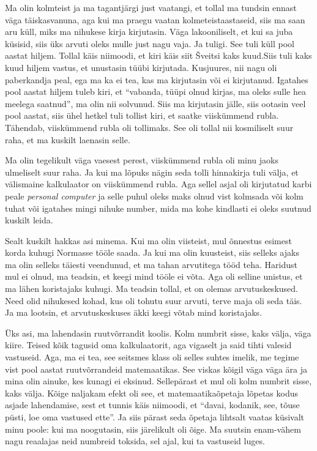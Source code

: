 Ma olin kolmteist ja ma  tagantjärgi just vaatangi, et tollal ma tundsin ennast väga täiskasvanuna, aga kui ma praegu vaatan kolmeteistaastaseid, siis ma saan aru küll, miks ma nihukese kirja kirjutasin. Väga lakooniliselt, et kui sa juba küsisid, siis üks arvuti oleks mulle just nagu vaja. Ja tuligi. See tuli küll pool aastat hiljem. Tollal käis niimoodi, et kiri käis siit Šveitsi kaks kuud.Siis tuli kaks kuud hiljem vastus, et unustasin tüübi kirjutada. Kusjuures, nii nagu oli paberkandja peal, ega ma ka ei tea, kas ma kirjutasin või ei kirjutanud. Igatahes pool aastat hiljem tuleb kiri, et \enquote{vabanda, tüüpi olnud kirjas, ma oleks sulle hea meelega saatnud}, ma olin nii solvunud. Siis ma kirjutasin jälle, siis ootasin veel pool aastat, siis ühel hetkel tuli tollist kiri, et  saatke viiskümmend rubla. Tähendab,  viiskümmend rubla oli tollimaks. See oli tollal nii kosmiliselt suur raha, et ma kuskilt laenasin selle. 


Ma olin tegelikult väga vaesest perest, viiskümmend rubla oli minu jaoks ulmeliselt suur raha. Ja kui ma lõpuks nägin seda tolli hinnakirja tuli välja, et välismaine kalkulaator on viiskümmend rubla. Aga sellel asjal oli kirjutatud karbi peale \emph{personal computer} ja selle puhul oleks maks olnud vist kolmsada või kolm tuhat või igatahes mingi nihuke number, mida ma kohe kindlasti ei oleks suutnud kuskilt leida. 

Sealt kuskilt hakkas asi minema. Kui ma olin viisteist,  mul õnnestus esimest korda kuhugi Normasse tööle saada. Ja kui ma olin kuusteist, siis selleks ajaks ma olin selleks täiesti veendunud, et ma tahan arvutitega tööd teha. Haridust mul ei olnud, ma teadsin, et keegi mind tööle ei võta. Aga oli selline unistus, et ma lähen koristajaks kuhugi. Ma teadsin tollal, et on olemas arvutuskeskused. Need olid nihukesed kohad, kus oli tohutu suur arvuti, terve maja oli seda täis. Ja ma lootsin, et arvutuskeskuses äkki keegi võtab mind koristajaks. 


Üks asi, ma lahendasin ruutvõrrandit koolis. Kolm numbrit sisse, kaks välja, väga kiire. Teised kõik tagusid oma kalkulaatorit, aga vigaselt ja said tihti valesid vastuseid. Aga, ma ei tea, see seitsmes klass oli selles suhtes imelik, me tegime vist pool aastat ruutvõrrandeid matemaatikas. See viskas kõigil  väga väga ära ja mina olin ainuke, kes kunagi ei eksinud. Sellepärast et mul oli kolm numbrit sisse, kaks välja. Kõige naljakam efekt oli see, et matemaatikaõpetaja lõpetas kodus asjade lahendamise, sest et tunnis käis niimoodi, et \enquote{davai, kodanik, see, tõuse püsti, loe oma vastused ette}. Ja siis pärast seda õpetaja lihtsalt vaatas küsivalt minu poole: kui ma noogutasin, siis  järelikult oli õige. Ma suutsin enam-vähem nagu reaalajas neid numbreid toksida, sel ajal, kui ta vastuseid luges. 

